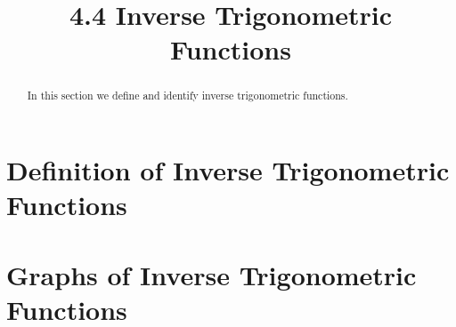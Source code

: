 \documentclass[handout]{ximera}
\title{4.4 Inverse Trigonometric Functions}
\begin{document}
\begin{abstract}
In this section we define and identify inverse trigonometric functions.
\end{abstract}

\maketitle


\section{Definition of Inverse Trigonometric Functions}




\section{Graphs of Inverse Trigonometric Functions}
\end{document}

